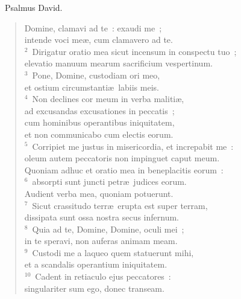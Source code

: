 ~\lettrine[lines=10,image=true,loversize=0.05,lraise=-0.03]{P}{}salmus David. \begin{flushleft}\begin{verse}\vspace{6pt}Domine, clamavi ad te~: exaudi me~;\\ intende voci me\ae , cum clamavero ad te.\\
${}^{2}$~Dirigatur oratio mea sicut incensum in conspectu tuo~;\\ elevatio manuum mearum sacrificium vespertinum.\\
${}^{3}$~Pone, Domine, custodiam ori meo,\\ et ostium circumstanti\ae\ labiis meis.\\
${}^{4}$~Non declines cor meum in verba maliti\ae ,\\ ad excusandas excusationes in peccatis~;\\ cum hominibus operantibus iniquitatem,\\ et non communicabo cum electis eorum.\\
${}^{5}$~Corripiet me justus in misericordia, et increpabit me~:\\ oleum autem peccatoris non impinguet caput meum.\\ Quoniam adhuc et oratio mea in beneplacitis eorum~:\\
${}^{6}$~absorpti sunt juncti petr\ae\ judices eorum.\\ Audient verba mea, quoniam potuerunt.\\
${}^{7}$~Sicut crassitudo terr\ae\ erupta est super terram,\\ dissipata sunt ossa nostra secus infernum.\\
${}^{8}$~Quia ad te, Domine, Domine, oculi mei~;\\ in te speravi, non auferas animam meam.\\
${}^{9}$~Custodi me a laqueo quem statuerunt mihi,\\ et a scandalis operantium iniquitatem.\\
${}^{10}$~Cadent in retiaculo ejus peccatores~:\\ singulariter sum ego, donec transeam.\end{verse}\end{flushleft}


